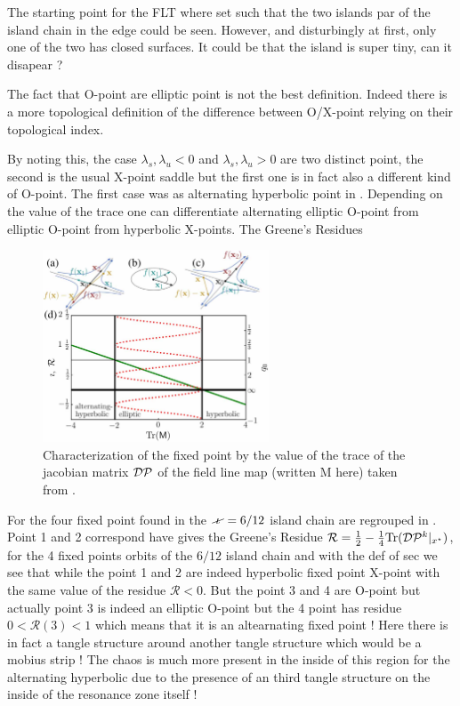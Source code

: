 The starting point for the FLT where set such that the two islands par of the island chain in the edge could be seen. However, and disturbingly at first, only one of the two has closed surfaces. It could be that the island is super tiny, can it disapear ? 

The fact that O-point are elliptic point is not the best definition. Indeed there is a more topological definition of the difference between O/X-point relying on their topological index. 

By noting this, the case $\lambda_s, \lambda_u < 0$ and $\lambda_s, \lambda_u > 0$ are two distinct point, the second is the usual X-point saddle but the first one is in fact also a different kind of O-point. The first case was as alternating hyperbolic point in \cite{smiet_bifurcations_2020}. Depending on the value of the trace one can differentiate alternating elliptic O-point from elliptic O-point from hyperbolic X-points. The Greene's Residues 

\begin{figure}[H]
    \centering
    \includegraphics[width=0.6\textwidth]{images/theory/smeit_sawtooth.jpg}
    \caption{Characterization of the fixed point by the value of the trace of the jacobian matrix $\mathcal{D}\mathcal{P}$ of the field line map (written M here) taken from \cite{smiet_bifurcations_2020}.}
    \label{fig:smeit-bifurcations}
\end{figure}

For the four fixed point found in the $\iotaslash = 6/12$ island chain are regrouped in . Point 1 and 2 correspond have 
 gives the Greene's Residue $\mathcal{R} = \frac{1}{2} - \frac{1}{4}\text{Tr}(\mathcal{D}\mathcal{P}^k\vert_{x^\star})$, for the 4 fixed points orbits of the $6/12$ island chain and with the def of sec we see that while the point 1 and 2 are indeed hyperbolic fixed point X-point with the same value of the residue $\mathcal{R} < 0$. But the point 3 and 4 are O-point but actually point 3 is indeed an elliptic O-point but the 4 point has residue $0 < \mathcal{R}(3) < 1$ which means that it is an altearnating fixed point ! Here there is in fact a tangle structure around another tangle structure which would be a mobius strip ! The chaos is much more present in the inside of this region for the alternating hyperbolic due to the presence of an third tangle structure on the inside of the resonance zone itself !

